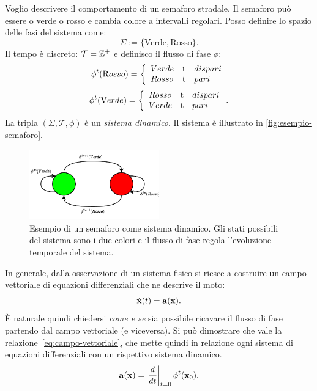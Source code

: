 \begin{example}
    \label{ex:semaforo}
    Voglio descrivere il comportamento di un semaforo stradale.
    Il semaforo può essere o verde o rosso e cambia colore a intervalli regolari.
    Posso definire lo spazio delle fasi del sistema come:
    \begin{equation*}
        \Sigma := \{\text{Verde}, \text{Rosso} \}.
    \end{equation*}
    Il tempo è discreto: $\mathcal T = \mathbb{Z}^+$ e definisco il flusso di fase $\phi$:
    \begin{equation*}
        \phi^t(\text Rosso) = \left\{
        \begin{array}{lrl}
            Verde &$t$ &dispari\\
            Rosso &$t$ &pari
        \end{array}
        \right.
    \end{equation*}
    \begin{equation*}
        \phi^t(\text Verde) = \left\{
        \begin{array}{lrl}
            Rosso &$t$ &dispari\\
            Verde &$t$ &pari
        \end{array}
        \right.
        .
    \end{equation*}
    La tripla $(\Sigma, \mathcal T, \phi)$ è un \emph{sistema dinamico}.
    Il sistema è illustrato in \autoref{fig:esempio-semaforo}.
    \begin{figure}[H]
        \centering
        \includegraphics[width=0.5\textwidth]{assets/ex-semaforo}
        \caption[Semaforo]{Esempio di un semaforo come sistema dinamico.
        Gli stati possibili del sistema sono i due colori e il flusso di fase
        regola l'evoluzione temporale del sistema.}
        \label{fig:esempio-semaforo}
    \end{figure}
\end{example}


In generale, dalla osservazione di un sistema fisico si riesce a costruire un campo vettoriale
di equazioni differenziali che ne descrive il moto:
\begin{equation*}
    \dot {\mathbf{x}} (t) = \mathbf{a}(\mathbf{x}).
\end{equation*}
È naturale quindi chiedersi \emph{come e se} sia possibile ricavare il flusso di fase partendo
dal campo vettoriale (e viceversa).
Si può dimostrare  che vale la relazione~\eqref{eq:campo-vettoriale},
che mette quindi in relazione ogni sistema di equazioni differenziali con un rispettivo sistema dinamico.
\begin{equation}
    \mathbf{a} (\mathbf{x}) = \left.\frac d {dt} \right| _{t=0} \phi^t (\mathbf{x}_0).
    \label{eq:campo-vettoriale}
\end{equation}


